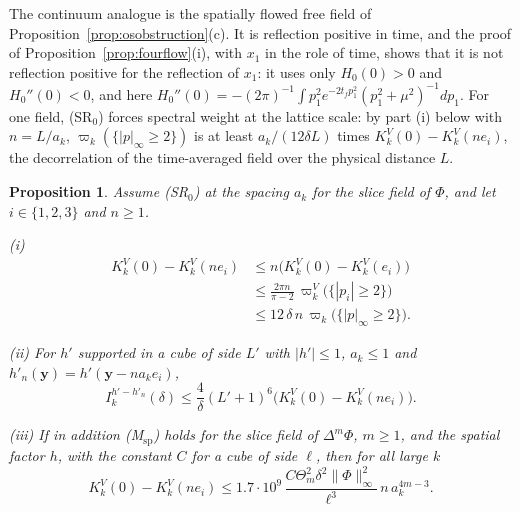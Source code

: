 \documentclass[aps,prd,twocolumn,superscriptaddress,nofootinbib,longbibliography,floatfix,amsmath,amssymb,10pt]{revtex4-2}
\newtheorem{proposition}[theorem]{Proposition}
\theoremstyle{definition}
\theoremstyle{remark}
\begin{document}
The continuum analogue is the spatially flowed free field of
Proposition~\ref{prop:osobstruction}(c). It is reflection positive in
time, and the proof of Proposition~\ref{prop:fourflow}(i), with $x_1$ in
the role of time, shows that it is not reflection positive for the
reflection of $x_1$: it uses only $H_0(0)>0$ and $H_0''(0)<0$, and here
$H_0''(0)=-(2\pi)^{-1}\int p_1^2e^{-2t_fp_1^2}(p_1^2+\mu^2)^{-1}dp_1$. For
one field, (SR$_0$) forces spectral weight at the lattice scale: by part
(i) below with $n=L/a_k$, $\varpi_k(\{|p|_\infty\ge2\})$ is at least
$a_k/(12\delta L)$ times $K^V_k(0)-K^V_k(ne_i)$, the decorrelation of the
time-averaged field over the physical distance $L$.

\begin{proposition}\label{prop:srrough}
Assume \textup{(SR$_0$)} at the spacing $a_k$ for the slice field of
$\Phi$, and let $i\in\{1,2,3\}$ and $n\ge1$.

\textup{(i)}
\[
\begin{split}
K^V_k(0)-K^V_k(ne_i)&\le n\bigl(K^V_k(0)-K^V_k(e_i)\bigr)\\
&\le\frac{2\pi n}{\pi-2}\,\varpi^V_k\bigl(\{|p_i|\ge2\}\bigr)\\
&\le12\,\delta\,n\,\varpi_k\bigl(\{|p|_\infty\ge2\}\bigr) .
\end{split}
\]

\textup{(ii)} For $h'$ supported in a cube of side $L'$ with $|h'|\le1$,
$a_k\le1$ and $h'_n(\mathbf y)=h'(\mathbf y-na_ke_i)$,
\[
I^{h'-h'_n}_k(\delta)\le\frac4\delta(L'+1)^6\bigl(K^V_k(0)-K^V_k(ne_i)
\bigr) .
\]

\textup{(iii)} If in addition \textup{(M$_{\mathrm{sp}}$)} holds for the
slice field of $\Delta^m\Phi$, $m\ge1$, and the spatial factor $h$, with
the constant $C$ for a cube of side $\ell$, then for all large $k$
\[
K^V_k(0)-K^V_k(ne_i)\le1.7\cdot10^9\,\frac{C\Theta_m^2\delta^2\|\Phi\|_
\infty^2}{\ell^3}\,n\,a_k^{4m-3} .
\]
\end{proposition}
\end{document}
